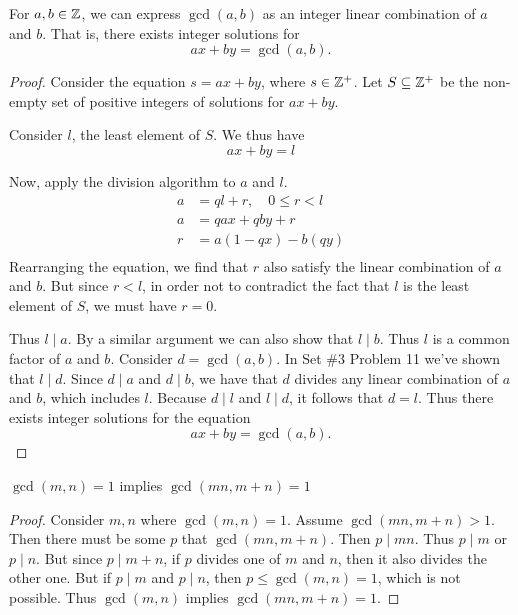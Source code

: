 \begin{theorem**}
    For $a, b \in \mathbb{Z}$, we can express $\gcd(a, b)$ as an integer linear combination of $a$ and $b$. That is, there exists integer solutions for
    \begin{equation*}
        ax+by=\gcd(a, b) .
    \end{equation*}
\end{theorem**}
\begin{proof}
    Consider the equation $s = ax+by$, where $s\in \mathbb{Z}^{+}$. Let $S \subseteq \mathbb{Z}^{+}$ be the non-empty set of positive integers of solutions for $ax + by$.

    Consider $l$, the least element of $S$. We thus have
    \begin{equation*}
        ax+by = l
    \end{equation*}

    Now, apply the division algorithm to $a$ and $l$.
    \begin{align*}
        a &= ql + r, \quad 0\leq r < l \\
        a &= qax + qby + r \\
        r &= a(1-qx) - b(qy) \\
    \end{align*}
    Rearranging the equation, we find that $r$ also satisfy the linear combination of $a$ and $b$. But since $r < l$, in order not to contradict the fact that $l$ is the least element of $S$, we must have $r = 0$.

    Thus $l \mid a$. By a similar argument we can also show that $l \mid b$. Thus $l$ is a common factor of $a$ and $b$. Consider $d = \gcd(a, b)$. In Set \#3 Problem 11 we've shown that $l \mid d$. Since $d \mid a$ and $d \mid b$, we have that $d$ divides any linear combination of $a$ and $b$, which includes $l$. Because $d \mid l$ and $l \mid d$, it follows that $d = l$. Thus there exists integer solutions for the equation
    \begin{equation*}
        ax+by = \gcd(a, b) .
    \end{equation*}
\end{proof}

\begin{theorem**}
    $\gcd(m, n) = 1$ implies $\gcd(mn, m+n) = 1$
\end{theorem**}
\begin{proof}
    Consider $m, n$ where $\gcd(m, n) = 1$. Assume $\gcd(mn, m+n) > 1$. Then there must be some $p$ that $\gcd(mn, m+n)$. Then $p \mid mn$. Thus $p \mid m$ or $p \mid n$. But since $p \mid m+n$, if $p$ divides one of $m$ and $n$, then it also divides the other one. But if $p \mid m$ and $p \mid n$, then $p \leq \gcd(m, n) = 1$, which is not possible. Thus $\gcd(m, n)$ implies $\gcd(mn, m+n) = 1$.
\end{proof}

